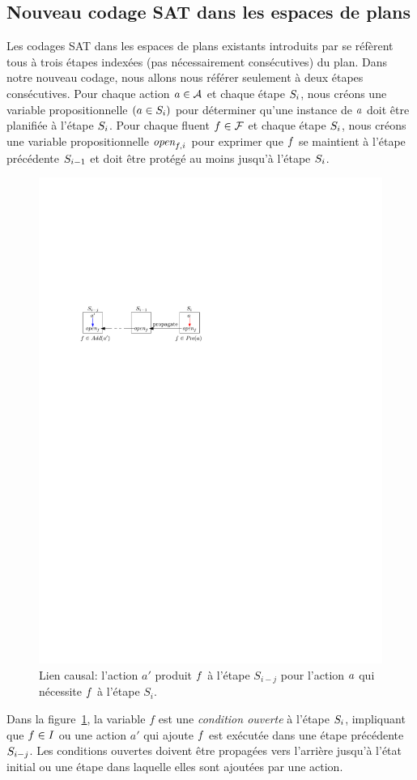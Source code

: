 %
%
\subsection{Nouveau codage SAT dans les espaces de plans}


Les codages SAT dans les espaces de plans existants introduits par \cite{MK99} se réfèrent tous à trois étapes indexées (pas nécessairement consécutives) du plan.
Dans notre nouveau codage, nous allons nous référer seulement à deux étapes consécutives.
Pour chaque action $\a\in\A$ et chaque étape $\step{i}$, nous créons une variable propositionnelle $\instep{a}{i}$ pour déterminer qu'une instance de $\a$ doit être planifiée à l'étape $\step{i}$.
Pour chaque fluent $\f\in\F$ et chaque étape $\step{i}$, nous créons une variable propositionnelle $\open{\f}{i}$ pour exprimer que $\f$ se maintient à l'étape précédente $\step{i-1}$ et doit être protégé au moins jusqu'à l'étape $\step{i}$.

\begin{figure}[h!]\centering
	\includegraphics[width=.5\textwidth]{figures/transitions}
    \caption{Lien causal: l'action $a'$ produit $\f$ à l'étape $S_{i-j}$ pour l'action $\a$ qui nécessite $\f$ à l'étape $S_{i}$.}
    \label{fig:causal-link-sat}
\end{figure}

Dans la figure~\ref{fig:causal-link-sat}, la variable $f$ est une \textit {condition ouverte} à l'étape $\S_i$, impliquant que $\f\in\I$ ou une action $a'$ qui ajoute $\f$ est exécutée dans une étape précédente $\S_{i-j}$.
Les conditions ouvertes doivent être propagées vers l'arrière jusqu'à l'état initial ou une étape dans laquelle elles sont ajoutées par une action.




